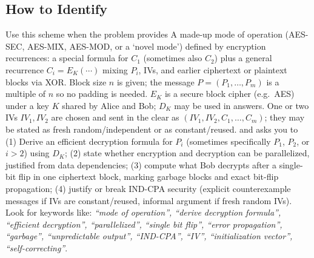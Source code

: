 \documentclass[12pt, a4paper]{article}
\begin{document}
\subsection*{How to Identify}
Use this scheme when the problem provides A made-up mode of operation (AES-SEC, AES-MIX, AES-MOD, or a `novel mode') defined by encryption recurrences: a special formula for $C_1$ (sometimes also $C_2$) plus a general recurrence $C_i = E_K(\cdots)$ mixing $P_i$, IVs, and earlier ciphertext or plaintext blocks via XOR. Block size $n$ is given; the message $P = (P_1, \dots, P_m)$ is a multiple of $n$ so no padding is needed. $E_K$ is a secure block cipher (e.g.\ AES) under a key $K$ shared by Alice and Bob; $D_K$ may be used in answers. One or two IVs $IV_1, IV_2$ are chosen and sent in the clear as $(IV_1, IV_2, C_1, \dots, C_m)$; they may be stated as fresh random/independent or as constant/reused. and asks you to (1) Derive an efficient decryption formula for $P_i$ (sometimes specifically $P_1$, $P_2$, or $i > 2$) using $D_K$; (2) state whether encryption and decryption can be parallelized, justified from data dependencies; (3) compute what Bob decrypts after a single-bit flip in one ciphertext block, marking garbage blocks and exact bit-flip propagation; (4) justify or break IND-CPA security (explicit counterexample messages if IVs are constant/reused, informal argument if fresh random IVs). Look for keywords like: \textit{``mode of operation'', ``derive decryption formula'', ``efficient decryption'', ``parallelized'', ``single bit flip'', ``error propagation'', ``garbage'', ``unpredictable output'', ``IND-CPA'', ``IV'', ``initialization vector'', ``self-correcting''}.
\end{document}
